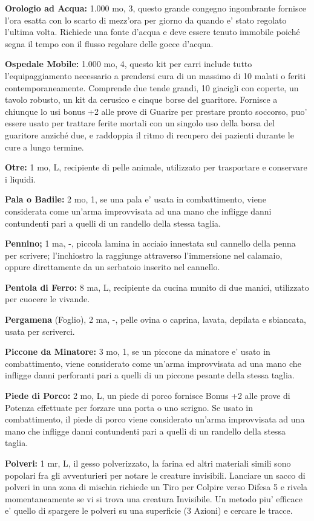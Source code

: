 \documentclass[a4paper,11pt,twoside,openany]{book}
\begin{document}
{		\textbf{Orologio ad Acqua:} 1.000 mo, 3, questo grande congegno ingombrante fornisce l'ora esatta con lo scarto di mezz'ora per giorno da quando e' stato regolato l'ultima volta. Richiede una fonte d'acqua e deve essere tenuto immobile poiché segna il tempo con il flusso regolare delle gocce d'acqua.
		
		\textbf{Ospedale Mobile:} 1.000 mo, 4, questo kit per carri include tutto l'equipaggiamento necessario a prendersi cura di un massimo di 10 malati o feriti contemporaneamente. Comprende due tende grandi, 10 giacigli con coperte, un tavolo robusto, un kit da cerusico e cinque borse del guaritore. Fornisce a chiunque lo usi bonus +2 alle prove di Guarire per prestare pronto soccorso, puo' essere usato per trattare ferite mortali con un singolo uso della borsa del guaritore anziché due, e raddoppia il ritmo di recupero dei pazienti durante le cure a lungo termine.
		
		\textbf{Otre:} 1 mo, L, recipiente di pelle animale, utilizzato per trasportare e conservare i liquidi.
		
		\textbf{Pala o Badile:} 2 mo, 1, se una pala e' usata in combattimento, viene considerata come un'arma improvvisata ad una mano che infligge danni contundenti pari a quelli di un randello della stessa taglia. 
		
		\textbf{Pennino;} 1 ma, -, piccola lamina in acciaio innestata sul cannello della penna per scrivere; l'inchiostro la raggiunge attraverso l'immersione nel calamaio, oppure direttamente da un serbatoio inserito nel cannello.
		
		\textbf{Pentola di Ferro:} 8 ma, L, recipiente da cucina munito di due manici, utilizzato per cuocere le vivande.
		
		\textbf{Pergamena} (Foglio), 2 ma, -, pelle ovina o caprina, lavata, depilata e sbiancata, usata per scriverci.
		
		\textbf{Piccone da Minatore:} 3 mo, 1, se un piccone da minatore e' usato in combattimento, viene considerato come un'arma improvvisata ad una mano che infligge danni perforanti pari a quelli di un piccone pesante della stessa taglia.
		
		\textbf{Piede di Porco:} 2 mo, L, un piede di porco fornisce Bonus +2 alle prove di Potenza effettuate per forzare una porta o uno scrigno. Se usato in combattimento, il piede di porco viene considerato un'arma improvvisata ad una mano che infligge danni contundenti pari a quelli di un randello della stessa taglia.
		
		\textbf{Polveri:} 1 mr, L, il gesso polverizzato, la farina ed altri materiali simili sono popolari fra gli avventurieri per notare le creature invisibili. Lanciare un sacco di polveri in una zona di mischia richiede un Tiro per Colpire verso Difesa 5 e rivela momentaneamente se vi si trova una creatura Invisibile. Un metodo piu' efficace e' quello di spargere le polveri su una superficie (3 Azioni) e cercare le tracce.
		
}
\end{document}
